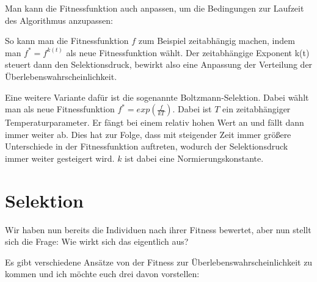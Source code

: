Man kann die Fitnessfunktion auch anpassen, um die Bedingungen zur Laufzeit des Algorithmus anzupassen:

So kann man die Fitnessfunktion $f$ zum Beispiel zeitabhängig machen, indem man $f^*=f^{k(t)}$ als neue Fitnessfunktion wählt. Der zeitabhängige Exponent k(t) steuert dann den Selektionsdruck, bewirkt also eine Anpassung der Verteilung der Überlebenswahrscheinlichkeit.

Eine weitere Variante dafür ist die sogenannte Boltzmann-Selektion. Dabei wählt man als neue Fitnessfunktion $f^*=exp(\frac{f}{kT})$. Dabei ist $T$ ein zeitabhängiger Temperaturparameter. Er fängt bei einem relativ hohen Wert an und fällt dann immer weiter ab. Dies hat zur Folge, dass mit steigender Zeit immer größere Unterschiede in der Fitnessfunktion auftreten, wodurch der Selektionsdruck immer weiter gesteigert wird. $k$ ist dabei eine Normierungskonstante.

\section{Selektion}
Wir haben nun bereits die Individuen nach ihrer Fitness bewertet, aber nun stellt sich die Frage:
Wie wirkt sich das eigentlich aus?

Es gibt verschiedene Ansätze von der Fitness zur Überlebenswahrscheinlichkeit zu kommen und ich möchte euch drei davon vorstellen:


